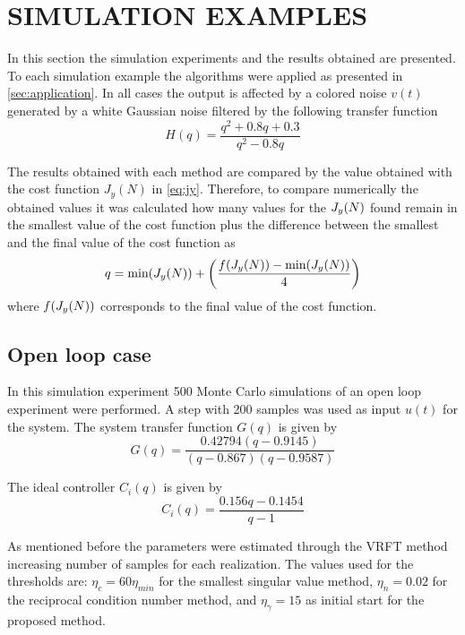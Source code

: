 \section{\label{sec:experiments} SIMULATION EXAMPLES}

In this section the simulation experiments and the results obtained are presented.
To each simulation example the algorithms were applied as presented in \autoref{sec:application}.
In all cases the output is affected by a colored noise $v(t)$ generated by a white Gaussian noise filtered by the following transfer function
\begin{equation*}
	H(q) = \frac{q^2 + 0.8q + 0.3}{q^2 - 0.8q}
\end{equation*}

The results obtained with each method are compared by the value obtained with the cost function $J_y(N)$ in \eqref{eq:jy}.
Therefore, to compare numerically the obtained values it was calculated how many values for the $J_y(N)$ found remain in the smallest value of the cost function plus the difference between the smallest and the final value of the cost function as
\begin{equation}
	q = \text{min}(J_y(N)) + \left( \frac{f(J_y(N)) - \text{min}(J_y(N))}{4} \right)
\label{eq:threshold_jy}
\end{equation}
where $f(J_y(N))$ corresponds to the final value of the cost function.

\subsection{Open loop case}

In this simulation experiment 500 Monte Carlo simulations of an open loop experiment were performed.
A step with 200 samples was used as input $u(t)$ for the system.
The system transfer function $G(q)$ is given by
\begin{equation}
	G(q) = \frac{0.42794 (q-0.9145)}{(q-0.867) (q-0.9587)}
\label{eq:tf_system}
\end{equation}

The ideal controller $C_i(q)$ is given by
\begin{equation}
	C_i(q) = \frac{0.156q - 0.1454}{q-1}
\label{eq:tf_ci}
\end{equation}


As mentioned before the parameters were estimated through the VRFT method increasing number of samples for each realization.
The values used for the thresholds are: $\eta_c = 60\eta_{min} $ for the smallest singular value method, $\eta_n = 0.02$ for the reciprocal condition number method, and $\eta_\gamma = 15$ as initial start for the proposed method.



